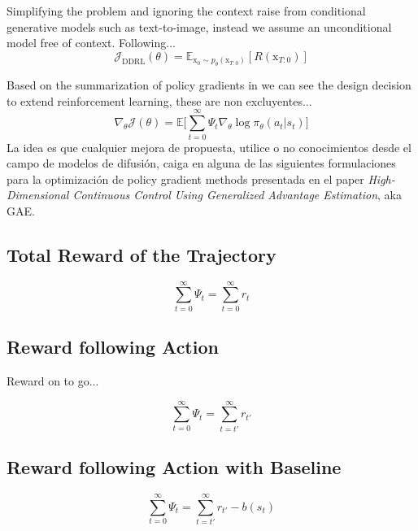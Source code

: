Simplifying the problem and ignoring the context raise from conditional generative models such as text-to-image, instead we assume an unconditional model free of context. Following...
\begin{equation}\label{difusion-rl-objective-2}
  \mathcal{J}_{\text{DDRL}}(\theta)
  = \mathbb{E}_{\mathrm{x}_{0}\sim p_{\theta}(\mathrm{x}_{T:0})}[R(\mathrm{x}_{T:0})]
\end{equation}

Based on the summarization of policy gradients in \cite{schulman2015high} we can see the design decision to extend reinforcement learning, these are non excluyentes...
\begin{equation}\label{eqn:general-pg-estimation-form}
  \nabla_{\theta}\mathcal{J}(\theta) = \mathbb{E}\bigg[\sum_{t=0}^{\infty}\Psi_{t}\nabla_{\theta}\log\pi_{\theta}(a_{t}|s_{t}) \bigg]
\end{equation}
La idea es que cualquier mejora de propuesta, utilice o no conocimientos
desde el campo de modelos de difusión, caiga en alguna de las siguientes
formulaciones para la optimización de policy gradient methods presentada
en el paper \textit{High-Dimensional Continuous Control Using Generalized Advantage Estimation}, aka GAE.

\subsection{Total Reward of the Trajectory}

\begin{equation}\label{eqn:psi-total-reward}
  \sum_{t=0}^{\infty}\Psi_{t} = \sum_{t=0}^{\infty} r_{t}
\end{equation}


\subsection{Reward following Action}

Reward on to go...

\begin{equation}\label{eqn:psi-reward-following-action}
  \sum_{t=0}^{\infty}\Psi_{t} = \sum_{t=t'}^{\infty} r_{t'}
\end{equation}

\subsection{Reward following Action with Baseline}

\begin{equation}\label{eqn:psi-reward-following-action-baseline}
  \sum_{t=0}^{\infty}\Psi_{t} = \sum_{t=t'}^{\infty} r_{t'} - b(s_{t})
\end{equation}


